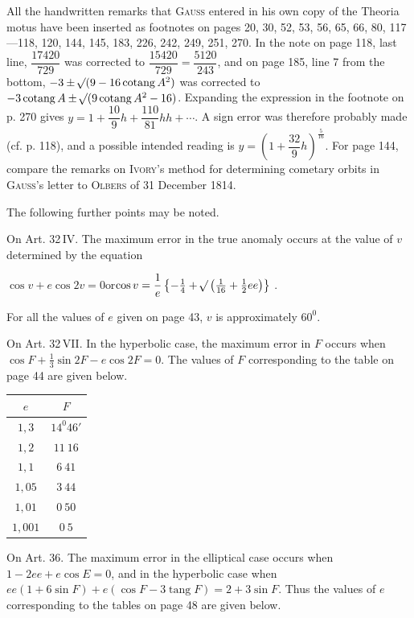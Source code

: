 All the handwritten remarks that \textsc{Gauss} entered in his own copy of the
Theoria motus have been inserted as footnotes on pages 20, 30, 52, 53, 56, 65, 66,
80, 117---118, 120, 144, 145, 183, 226, 242, 249, 251, 270. In the note on page 118,
last line, $\dfrac{17420}{729}$ was corrected to $\dfrac{15420}{729} =
\dfrac{5120}{243}$, and on page 185, line 7 from the bottom,
$-3 \pm \mathord{{}^{}\!\surd}(9-16\operatorname{cotang} A^2)$ was corrected to
$-3\operatorname{cotang} A \pm \mathord{{}^{}\!\surd}(9\operatorname{cotang} A^2-16)$.
Expanding the expression in the footnote on p. 270 gives
$y = 1 + \dfrac{10}{9}h + \dfrac{110}{81}hh + \cdots$. A sign error was therefore
probably made (cf. p. 118), and a possible intended reading is
$y = \left(1+\dfrac{32}{9}h\right)^{\frac{5}{16}}$. For page 144, compare the remarks
on \textsc{Ivory}'s method for determining cometary orbits in \textsc{Gauss}'s letter
to \textsc{Olbers} of 31 December 1814.

The following further points may be noted.

On Art. 32\,IV. The maximum error in the true anomaly occurs at the value of $v$
determined by the equation
\begin{center}
$\cos v + e\cos 2v = 0$\quad or\quad \mbox{$\cos v = \dfrac1e\left\{ -\tfrac14 + \mathord{{}^{}\!\surd}\left(\tfrac1{16}+\tfrac12 ee\right)\right\}$}
.
\end{center}
For all the values of $e$ given on page 43, $v$ is approximately $60^0$.

On Art. 32\,VII. In the hyperbolic case, the maximum error in $F$ occurs when
$\cos F + \tfrac13\sin 2F - e\cos 2F = 0$. The values of $F$ corresponding to the
table on page 44 are given below.

\begin{center}
\begin{tabular}{c|c}
$e$ & $F$ \\
\hline
$1{,}3$ & $14^0 46'$ \\
$1{,}2$ & $11\ 16$ \\
$1{,}1$ & $6\ 41$ \\
$1{,}05$ & $3\ 44$ \\
$1{,}01$ & $0\ 50$ \\
$1{,}001$ & $0\ 5$ \\
\end{tabular}
\end{center}

On Art. 36. The maximum error in the elliptical case occurs when $1-2ee+e\cos E = 0$,
and in the hyperbolic case when $ee(1+6\sin F)+e(\cos F-3\operatorname{tang} F) = 2+3\sin F$.
Thus the values of $e$ corresponding to the tables on page 48 are given below.

